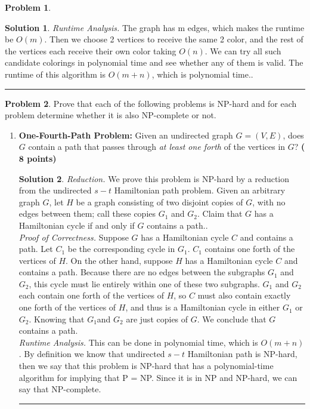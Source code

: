 \documentclass{article}
\theoremstyle{definition}
\newtheorem{problem}{Problem}
\def\fline{\rule{0.75\linewidth}{0.5pt}}
\newcommand{\finishline}{\begin{center}\fline\end{center}}
\newtheorem*{solution*}{Solution}
\newenvironment{solution}{\begin{solution*}}{{\finishline} \end{solution*}}
\newcommand{\grade}[1]{\hfill{\textbf{($\mathbf{#1}$ points)}}}
\begin{document}
\begin{problem}
\begin{itemize}
\begin{solution}
	\emph{Runtime Analysis.} The graph has m edges, which makes the runtime be $O(m)$. Then we choose 2 vertices to receive the same 2 color, and the rest of the vertices each receive their own color taking $O(n)$. We can try all such candidate colorings in polynomial time and see whether any of them is valid. The runtime of this algorithm is $O(m+n)$, which is polynomial time.. \\
	
\end{solution}

	\end{itemize}
\end{problem}




\bigskip


\begin{problem}
Prove that each of the following problems is NP-hard and for each problem determine whether it is also NP-complete or not. 

\begin{enumerate}[label=(\alph*)]
	\item \textbf{One-Fourth-Path Problem:} Given an undirected graph $G=(V,E)$, does $G$ contain a path that passes through \emph{at least one forth}  of the vertices in $G$?  \grade{8}

\begin{solution}

	\emph{Reduction.} We prove this problem is NP-hard by a reduction from the undirected  $s-t$ Hamiltonian path problem. Given an arbitrary graph $G$, let $H$ be a graph consisting of two disjoint copies of $G$, with no edges between them; call these copies $G_1$ and $G_2$. Claim that $G$ has a Hamiltonian cycle if and only if $G$ contains a path.. \\

	
	\emph{Proof of Correctness.} Suppose $G$ has a Hamiltonian cycle $C$ and contains a path. Let $C_1$ be the corresponding cycle in $G_1$. $C_1$ contains one forth of the vertices of $H$. On the other hand, suppose $H$ has a Hamiltonian cycle $C$ and contains a path. Because there are no edges between the subgraphs $G_1$ and $G_2$, this cycle must lie entirely within one of these two subgraphs. $G_1$ and $G_2$ each contain one forth of the vertices of $H$, so $C$ must also contain exactly one forth of the vertices of $H$, and thus is a Hamiltonian cycle in either $G_1$ or $G_2$. Knowing that $G_1$and $G_2$ are just copies of $G$. We conclude that $G$ contains a path. \\	
	\emph{Runtime Analysis.} This can be done in polynomial time, which is $O(m+n)$. By definition we know that undirected $s-t$ Hamiltonian path is NP-hard, then we say that this problem is NP-hard that has a polynomial-time algorithm for implying that P = NP. Since it is in NP and NP-hard, we can say that NP-complete. \\
	

\end{solution}
\end{enumerate}
\end{problem}
\end{document}
